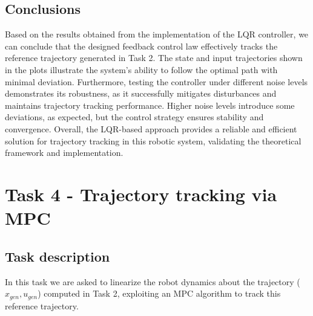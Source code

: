 \documentclass[a4paper,11pt,oneside]{book}
\begin{document}
\section{Conclusions}
\begin{justify}
    {Based on the results obtained from the implementation of the LQR controller, we can conclude that the designed feedback control law effectively tracks the reference trajectory generated in Task 2. The state and input trajectories shown in the plots illustrate the system's ability to follow the optimal path with minimal deviation. Furthermore, testing the controller under different noise levels demonstrates its robustness, as it successfully mitigates disturbances and maintains trajectory tracking performance. Higher noise levels introduce some deviations, as expected, but the control strategy ensures stability and convergence. Overall, the LQR-based approach provides a reliable and efficient solution for trajectory tracking in this robotic system, validating the theoretical framework and implementation.}
\end{justify}

\chapter{Task 4 - Trajectory tracking via MPC}
\section{Task description}
\begin{justify}
    {In this task we are asked to linearize the robot dynamics about the trajectory ($x_{gen},u_{gen}$) computed in Task 2, exploiting an MPC algorithm to track this reference trajectory.}
\end{justify}
\end{document}
